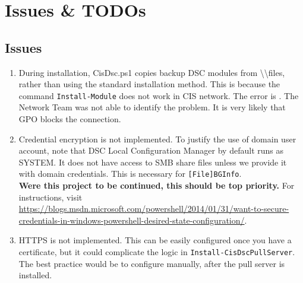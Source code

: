\chapter{Issues \& TODOs}
\label{overview}

  \section{Issues}
    \begin{enumerate}[label=(\roman*)]
      \item During installation, CisDsc.ps1 copies backup DSC modules from \textbackslash\textbackslash files, rather than using the standard installation method. This is because the command \verb|Install-Module| does not work in CIS network. The error is . The Network Team was not able to identify the problem. It is very likely that GPO blocks the connection.
      \item Credential encryption is not implemented. To justify the use of domain user account, note that DSC Local Configuration Manager by default runs as SYSTEM. It does not have access to SMB share files unless we provide it with domain credentials. This is necessary for \verb|[File]BGInfo|.\\
      \textbf{Were this project to be continued, this should be top priority.} For instructions, visit \url{https://blogs.msdn.microsoft.com/powershell/2014/01/31/want-to-secure-credentials-in-windows-powershell-desired-state-configuration/}.
      \item HTTPS is not implemented. This can be easily configured once you have a certificate, but it could complicate the logic in \verb|Install-CisDscPullServer|. The best practice would be to configure manually, after the pull server is installed.
    \end{enumerate}

